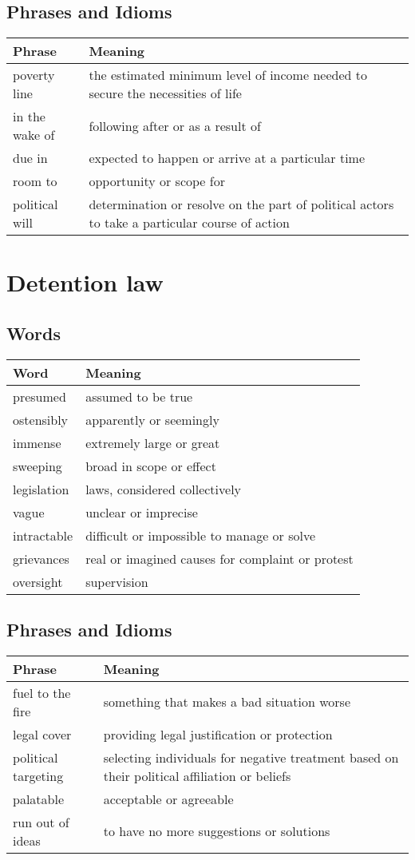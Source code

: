 \documentclass{article}%
\begin{document}
%
\subsection{Phrases and Idioms}%
\label{subsec:PhrasesandIdioms}%
\begin{tabular}{ll}%
Phrase&Meaning\\%
\hline%
poverty line&the estimated minimum level of income needed to secure the necessities of life\\%
in the wake of&following after or as a result of\\%
due in&expected to happen or arrive at a particular time\\%
room to&opportunity or scope for\\%
political will&determination or resolve on the part of political actors to take a particular course of action\\%
\end{tabular}

%
\section{Detention law}%
\label{sec:Detentionlaw}%
\subsection{Words}%
\label{subsec:Words}%
\begin{tabular}{ll}%
Word&Meaning\\%
\hline%
presumed&assumed to be true\\%
ostensibly&apparently or seemingly\\%
immense&extremely large or great\\%
sweeping&broad in scope or effect\\%
legislation&laws, considered collectively\\%
vague&unclear or imprecise\\%
intractable&difficult or impossible to manage or solve\\%
grievances&real or imagined causes for complaint or protest\\%
oversight&supervision\\%
\end{tabular}

%
\subsection{Phrases and Idioms}%
\label{subsec:PhrasesandIdioms}%
\begin{tabular}{ll}%
Phrase&Meaning\\%
\hline%
fuel to the fire&something that makes a bad situation worse\\%
legal cover&providing legal justification or protection\\%
political targeting&selecting individuals for negative treatment based on their political affiliation or beliefs\\%
palatable&acceptable or agreeable\\%
run out of ideas&to have no more suggestions or solutions\\%
\end{tabular}

%
\end{document}
